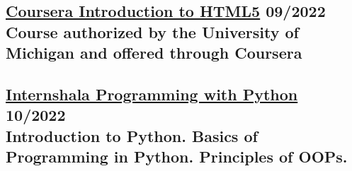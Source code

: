 \subsection{\href{https://www.coursera.org/account/accomplishments/verify/F4CYXQ87QGPE?utm_source=link&utm_medium=certificate&utm_content=cert_image&utm_campaign=sharing_cta&utm_product=course}{Coursera Introduction to HTML5} \hfill \textbf{09/2022} \\
Course authorized by the University of Michigan and offered through Coursera}

\subsection{\href{https://trainings.internshala.com/view_certificate/0964F207-EFA3-0474-D33D-ED948619537A/91B30E22-9A37-61E1-C8B2-69ACC7798F0F/}{Internshala Programming with Python}  \hfill \textbf{10/2022} \\
Introduction to Python. Basics of Programming in Python. Principles of OOPs.}
